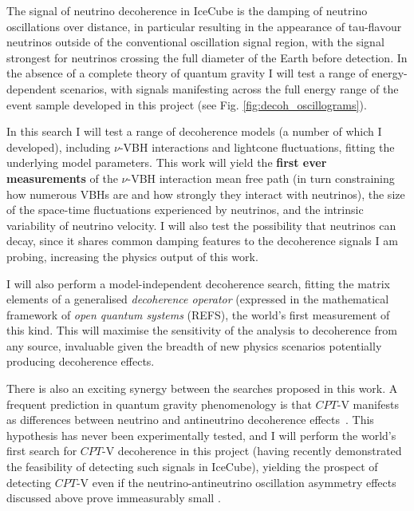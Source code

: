 \documentclass[a4paper,11pt]{article}
\begin{document}
The signal of neutrino decoherence in IceCube is the damping of neutrino oscillations over distance, in particular resulting in the appearance of tau-flavour neutrinos outside of the conventional oscillation signal region, with the signal strongest for neutrinos crossing the full diameter of the Earth before detection. In the absence of a complete theory of quantum gravity I will test a range of energy-dependent scenarios, with signals manifesting across the full energy range of the event sample developed in this project (see Fig. \ref{fig:decoh_oscillograms}).

In this search I will test a range of decoherence models (a number of which I developed), including $\nu$-VBH interactions and lightcone fluctuations, fitting the underlying model parameters. This work will yield the \textbf{first ever measurements} of the $\nu$-VBH interaction mean free path (in turn constraining how numerous VBHs are and how strongly they interact with neutrinos), the size of the space-time fluctuations experienced by neutrinos, and the intrinsic variability of neutrino velocity. I will also test the possibility that neutrinos can decay, since it shares common damping features to the decoherence signals I am probing, increasing the physics output of this work.

I will also perform a model-independent decoherence search, fitting the matrix elements of a generalised \textit{decoherence operator} (expressed in the mathematical framework of \textit{open quantum systems} (REFS), the world's first measurement of this kind. This will maximise the sensitivity of the analysis to decoherence from any source, invaluable given the breadth of new physics scenarios potentially producing decoherence effects. 


There is also an exciting synergy between the searches proposed in this work. A frequent prediction in quantum gravity phenomenology is that $CPT$-V manifests as differences between neutrino and antineutrino decoherence effects~\cite{Mavromatos_2009, Barenboim:2004wu, Carrasco:2018sca, Buoninfante:2020iyr, Capolupo:2020myw}. This hypothesis has never been experimentally tested, and I will perform the world's first search for $CPT$-V decoherence in this project (having recently demonstrated the feasibility of detecting such signals in IceCube), yielding the prospect of detecting $CPT$-V even if the neutrino-antineutrino oscillation asymmetry effects discussed above prove immeasurably small .
\end{document}
